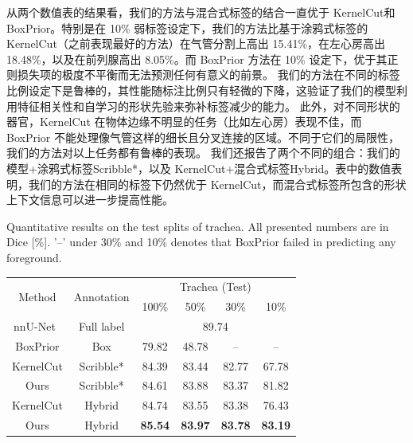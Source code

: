 从两个数值表的结果看，我们的方法与混合式标签的结合一直优于 KernelCut\citet{tang2018regularized}和 BoxPrior\citet{kervadec2020bounding}。特别是在 10\% 弱标签设定下，我们的方法比基于涂鸦式标签的 KernelCut（之前表现最好的方法）在气管分割上高出 15.41\%，在左心房高出 18.48\%，以及在前列腺高出 8.05\%。而 BoxPrior 方法在 10\% 设定下，优于其正则损失项的极度不平衡而无法预测任何有意义的前景。
我们的方法在不同的标签比例设定下是鲁棒的，其性能随标注比例只有轻微的下降，这验证了我们的模型利用特征相关性和自学习的形状先验来弥补标签减少的能力。
此外，对不同形状的器官，KernelCut 在物体边缘不明显的任务（比如左心房）表现不佳，而 BoxPrior 不能处理像气管这样的细长且分叉连接的区域。不同于它们的局限性，我们的方法对以上任务都有鲁棒的表现。
我们还报告了两个不同的组合：我们的模型+涂鸦式标签Scribble*，以及 KernelCut+混合式标签Hybrid。表中的数值表明，我们的方法在相同的标签下仍然优于 KernelCut，而混合式标签所包含的形状上下文信息可以进一步提高性能。


    \begin{table}[t!]
        {Quantitative results on the test splits of trachea. All presented numbers are in Dice [\%]. '--' under 30\% and 10\% denotes that BoxPrior failed in predicting any foreground.}
        \centering    
            \begin{tabular}{c|c|c c c c }
                \toprule
                \multirow{2}{*}{Method} & \multirow{2}{*}{Annotation} & \multicolumn{4}{c}{Trachea (Test)}  \\ 
                &                        & 100\% & 50\% & 30\% & 10\%                             \\ \midrule
                nnU-Net~\cite{isensee2019automated}     & Full label        & \multicolumn{4}{c}{89.74}          \\ \cmidrule{1-6}
                BoxPrior\cite{kervadec2020bounding}    & Box  & 79.82  & 48.78  & -- & --  \\
                KernelCut\cite{tang2018regularized}   & Scribble* & 84.39  & 83.44  & 82.77  & 67.78  \\
                Ours & Scribble* & 84.61 & 83.88 & 83.37 & 81.82  \\
                KernelCut\cite{tang2018regularized}   & Hybrid & 84.74 & 83.55	& 83.38	& 76.43             \\
                Ours        & Hybrid    & \textbf{85.54} & \textbf{83.97} & \textbf{83.78} & \textbf{83.19}                           \\
                \bottomrule
            \end{tabular}
        
        \label{tab:test_res1}
    \end{table}



